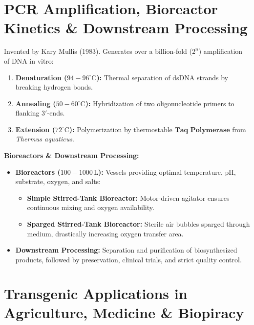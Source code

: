 \documentclass[10pt,twoside,openright]{book}
\begin{document}
\section{PCR Amplification, Bioreactor Kinetics \& Downstream Processing}

\begin{formulabox}
Invented by Kary Mullis (1983). Generates over a billion-fold ($2^n$) amplification of DNA in vitro:
\begin{enumerate}[leftmargin=*]
  \item \textbf{Denaturation ($94-96^\circ\mathrm{C}$):} Thermal separation of dsDNA strands by breaking hydrogen bonds.
  \item \textbf{Annealing ($50-60^\circ\mathrm{C}$):} Hybridization of two oligonucleotide primers to flanking $3'$-ends.
  \item \textbf{Extension ($72^\circ\mathrm{C}$):} Polymerization by thermostable $\mathbf{\text{Taq Polymerase}}$ from \textit{Thermus aquaticus}.
\end{enumerate}

\textbf{Bioreactors \& Downstream Processing:}
\begin{itemize}
  \item \textbf{Bioreactors ($100-1000\,\mathrm{L}$):} Vessels providing optimal temperature, pH, substrate, oxygen, and salts:
  \begin{itemize}
    \item \textbf{Simple Stirred-Tank Bioreactor:} Motor-driven agitator ensures continuous mixing and oxygen availability.
    \item \textbf{Sparged Stirred-Tank Bioreactor:} Sterile air bubbles sparged through medium, drastically increasing oxygen transfer area.
  \end{itemize}
  \item \textbf{Downstream Processing:} Separation and purification of biosynthesized products, followed by preservation, clinical trials, and strict quality control.
\end{itemize}
\end{formulabox}

\section{Transgenic Applications in Agriculture, Medicine \& Biopiracy}
\end{document}
